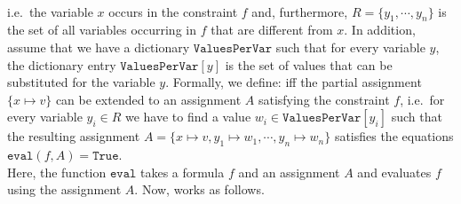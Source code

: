 \\[0.2cm]
i.e.~the variable $x$ occurs in the constraint $f$ and, furthermore, $R = \{y_1, \cdots, y_n\}$ is the set of
all variables occurring 
in $f$ that are different from $x$.  In addition, assume that we have a dictionary $\texttt{ValuesPerVar}$ such that
for every variable $y$, the dictionary entry $\texttt{ValuesPerVar}[y]$ is the set of values that can be substituted
for the variable $y$.  Formally, we define: 
iff the partial assignment $\{ x \mapsto v \}$ can be extended to an assignment $A$ satisfying the constraint $f$,
i.e.~for every variable $y_i \in R$ we have to find a value $w_i \in \texttt{ValuesPerVar}[y_i]$ such that the resulting
assignment $A = \{ x \mapsto v, y_1 \mapsto w_1, \cdots, y_n \mapsto w_n \}$ satisfies the equations
\\[0.2cm]
\hspace*{1.3cm}
$\texttt{eval}(f, A) = \texttt{True}$.
\\[0.2cm]
Here, the function $\texttt{eval}$ takes a formula $f$ and an assignment $A$ and evaluates $f$ using the
assignment $A$.  Now,  works as follows. 
